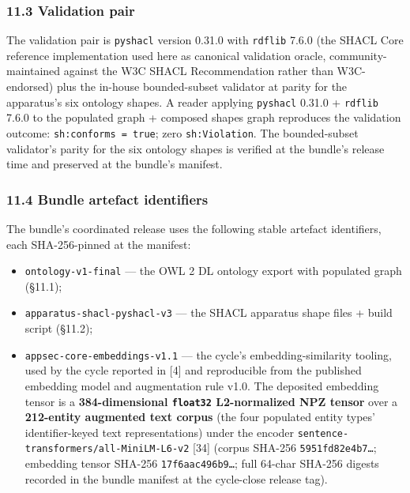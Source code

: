 \documentclass[
]{article}
\providecommand{\tightlist}{%
  \setlength{\itemsep}{0pt}\setlength{\parskip}{0pt}}
\begin{document}
\subsubsection{11.3 Validation pair}\label{validation-pair}

The validation pair is \texttt{pyshacl} version 0.31.0 with
\texttt{rdflib} 7.6.0 (the SHACL Core reference implementation used here
as canonical validation oracle, community-maintained against the W3C
SHACL Recommendation rather than W3C-endorsed) plus the in-house
bounded-subset validator at parity for the apparatus's six ontology
shapes. A reader applying \texttt{pyshacl} 0.31.0 + \texttt{rdflib}
7.6.0 to the populated graph + composed shapes graph reproduces the
validation outcome: \texttt{sh:conforms\ =\ true}; zero
\texttt{sh:Violation}. The bounded-subset validator's parity for the six
ontology shapes is verified at the bundle's release time and preserved
at the bundle's manifest.

\subsubsection{11.4 Bundle artefact
identifiers}\label{bundle-artefact-identifiers}

The bundle's coordinated release uses the following stable artefact
identifiers, each SHA-256-pinned at the manifest:

\begin{itemize}
\tightlist
\item
  \texttt{ontology-v1-final} --- the OWL 2 DL ontology export with
  populated graph (§11.1);
\item
  \texttt{apparatus-shacl-pyshacl-v3} --- the SHACL apparatus shape
  files + build script (§11.2);
\item
  \texttt{appsec-core-embeddings-v1.1} --- the cycle's
  embedding-similarity tooling, used by the cycle reported in {[}4{]}
  and reproducible from the published embedding model and augmentation
  rule v1.0. The deposited embedding tensor is a \textbf{384-dimensional
  \texttt{float32} L2-normalized NPZ tensor} over a \textbf{212-entity
  augmented text corpus} (the four populated entity types'
  identifier-keyed text representations) under the encoder
  \texttt{sentence-transformers/all-MiniLM-L6-v2} {[}34{]} (corpus
  SHA-256 \texttt{5951fd82e4b7…}; embedding tensor SHA-256
  \texttt{17f6aac496b9…}; full 64-char SHA-256 digests recorded in the
  bundle manifest at the cycle-close release tag).
\end{itemize}
\end{document}
